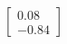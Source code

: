 \documentclass[preview]{standalone}
\begin{document}
\begin{align*}
\begin{bmatrix} 0.08 \\ -0.84 \end{bmatrix}
\end{align*}
\end{document}
